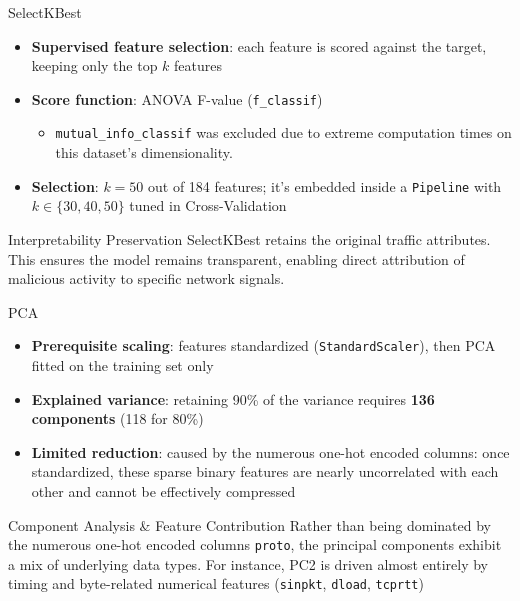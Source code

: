 \documentclass{beamer}
\begin{document}
\begin{frame}{SelectKBest}
  \begin{itemize}
    \item \textbf{Supervised feature selection}: each feature is scored against the
      target, keeping only the top $k$ features
\item \textbf{Score function}: ANOVA F-value (\texttt{f\_classif})
      \begin{itemize}
        \item \texttt{mutual\_info\_classif} was excluded due to extreme
          computation times on this dataset's dimensionality.
      \end{itemize}
    \item \textbf{Selection}: $k = 50$ out of 184 features; it's embedded inside a \texttt{Pipeline} with $k \in \{30, 40, 50\}$ tuned in Cross-Validation
  \end{itemize}
  \vspace{0.3cm}
  \begin{block}{Interpretability Preservation}
    SelectKBest retains the original traffic attributes. This ensures the model remains transparent, enabling direct attribution of malicious activity to specific network signals.
  \end{block}
\end{frame}

\begin{frame}{PCA}
  \begin{itemize}
    \item \textbf{Prerequisite scaling}: features standardized (\texttt{StandardScaler}), then PCA fitted
      on the training set only
    \item \textbf{Explained variance}: retaining 90\% of the variance requires \textbf{136 components} (118 for 80\%) 
    \item \textbf{Limited reduction}: caused by the numerous one-hot encoded columns: once standardized, these sparse binary features are nearly uncorrelated with each other and cannot be effectively compressed
  \end{itemize}
  \vspace{0.3cm}
  \begin{block}{Component Analysis \& Feature Contribution}
    Rather than being dominated by the numerous one-hot encoded columns \texttt{proto}, the principal components exhibit a mix of underlying data types. For instance, PC2 is driven almost entirely by timing and byte-related numerical features (\texttt{sinpkt}, \texttt{dload}, \texttt{tcprtt})
  \end{block}
\end{frame}
\end{document}
